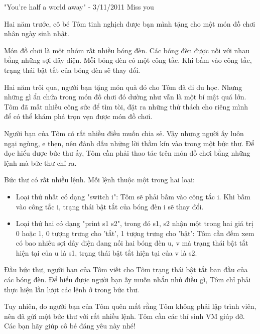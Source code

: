 "You're half a world away" - 3/11/2011 Miss you

Hai năm trước, cô bé Tôm tinh nghịch được bạn mình tặng cho một món đồ chơi nhân ngày sinh nhật.

Món đồ chơi là một nhóm rất nhiều bóng đèn. Các bóng đèn được nối với nhau bằng những sợi dây điện. Mỗi bóng đèn có một công tắc. Khi bấm vào công tắc, trạng thái bật tắt của bóng đèn sẽ thay đổi.

Hai năm trôi qua, người bạn tặng món quà đó cho Tôm đã đi du học. Nhưng những gì ẩn chứa trong món đồ chơi đó dường như vẫn là một bí mật quá lớn. Tôm đã mất nhiều công sức để tìm tòi, đặt ra những thử thách cho riêng mình để có thể khám phá trọn vẹn được món đồ chơi.

Người bạn của Tôm có rất nhiều điều muốn chia sẻ. Vậy nhưng người ấy luôn ngại ngùng, e thẹn, nên đành dấu những lời thầm kín vào trong một bức thư. Để đọc hiểu được bức thư ấy, Tôm cần phải thao tác trên món đồ chơi bằng những lệnh mà bức thư chỉ ra.

Bức thư có rất nhiều lệnh. Mỗi lệnh thuộc một trong hai loại:
\begin{itemize}
	\item Loại thứ nhất có dạng "switch i": Tôm sẽ phải bấm vào công tắc i. Khi bấm vào công tắc i, trạng thái bật tắt của bóng đèn i sẽ thay đổi.
	\item Loại thứ hai có dạng "print s1 s2", trong đó s1, s2 nhận một trong hai giá trị 0 hoặc 1, 0 tượng trưng cho 'tắt', 1 tượng trưng cho 'bật': Tôm cần đếm xem có bao nhiêu sợi dây điện đang nối hai bóng đèn u, v mà trạng thái bật tắt hiện tại của u là s1, trạng thái bật tắt hiện tại của v là s2.
\end{itemize}

Đầu bức thư, người bạn của Tôm viết cho Tôm trạng thái bật tắt ban đầu của các bóng đèn. Để hiểu được người bạn ấy muốn nhắn nhủ điều gì, Tôm chỉ phải thực hiện lần lượt các lệnh ở trong bức thư.

Tuy nhiên, do người bạn của Tôm quên mất rằng Tôm không phải lập trình viên, nên đã gửi một bức thư với rất nhiều lệnh. Tôm cần các thí sinh VM giúp đỡ. Các bạn hãy giúp cô bé đáng yêu này nhé!